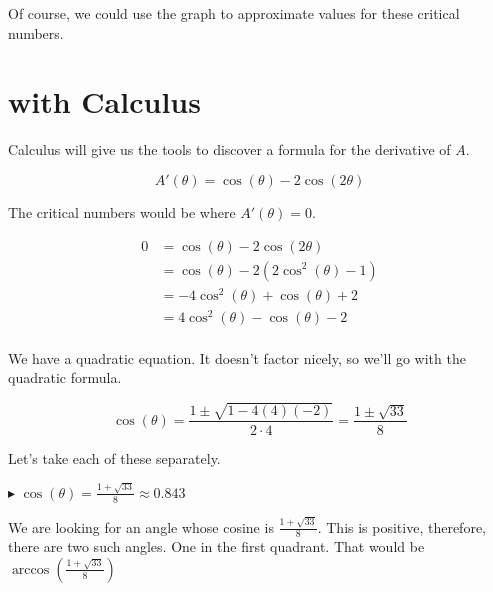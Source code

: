 \documentclass{ximera}
\begin{document}
Of course, we could use the graph to approximate values for these critical numbers.




\section*{with Calculus}

Calculus will give us the tools to discover a formula for the derivative of $A$.


\[   A'(\theta) = \cos(\theta)-2 \cos(2\theta)    \]


The critical numbers would be where $A'(\theta) = 0$.



\begin{align*}
0    & = \cos(\theta)-2 \cos(2\theta)   \\
     & = \cos(\theta) - 2 (2 \cos^2(\theta) - 1)    \\
     & = -4 \cos^2(\theta) + \cos(\theta) + 2   \\
     & = 4 \cos^2(\theta) - \cos(\theta) - 2   \\
\end{align*}


We have a quadratic equation.  It doesn't factor nicely, so we'll go with the quadratic formula.



\[   \cos(\theta) = \frac{1 \pm \sqrt{1 - 4 (4)(-2)}}{2 \cdot 4}  = \frac{1 \pm \sqrt{33}}{8}        \]




Let's take each of these separately.



$\blacktriangleright$  $\cos(\theta) = \frac{1 + \sqrt{33}}{8}   \approx  0.843$


We are looking for an angle whose cosine is $\frac{1 + \sqrt{33}}{8}$.  This is positive, therefore, there are two such angles. One in the first quadrant.  That would be $\arccos\left(\frac{1 + \sqrt{33}}{8}\right)$
\end{document}

